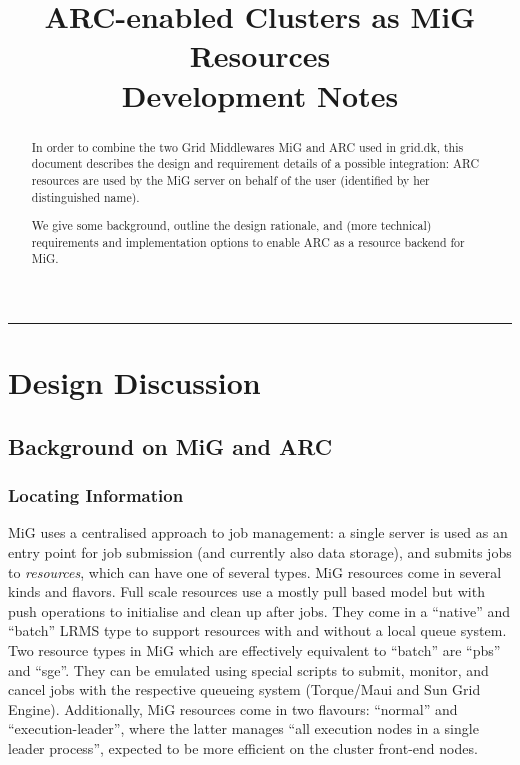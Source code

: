 \documentclass[11pt]{article}
\title{ARC-enabled Clusters as MiG Resources\\[2ex] 
       Development Notes}
\newcommand{\horiz}{{\rule{\textwidth}{.5pt}}}
\begin{document}
\maketitle

\horiz

\begin{abstract}
In order to combine the two Grid Middlewares MiG and ARC used in
grid.dk, this document describes the design and requirement details of
a possible integration: ARC resources are used by the MiG server on
behalf of the user (identified by her distinguished name).

We give some background, outline the design rationale, and (more
technical) requirements and implementation options to enable ARC as a
resource backend for MiG.
\end{abstract}

\tableofcontents


\section{Design Discussion}

\subsection{Background on MiG and ARC}

\subsubsection{Locating Information}
MiG uses a centralised approach to job management: a single server is
used as an entry point for job submission (and currently also data
storage), and submits jobs to \emph{resources}, which can have one of
several types.
%
MiG resources come in several kinds and flavors. Full scale resources
use a mostly pull based model but with push operations to initialise
and clean up after jobs. They come in a ``native'' and ``batch'' LRMS
type to support resources with and without a local queue system.
%
Two resource types in MiG which are effectively equivalent to
``batch'' are ``pbs'' and ``sge''. They can be emulated using special
scripts to submit, monitor, and cancel jobs with the respective
queueing system (Torque/Maui and Sun Grid Engine).
Additionally, MiG resources come in two flavours: ``normal'' and
``execution-leader'', where the latter manages ``all execution nodes
in a single leader process'', expected to be more efficient on the
cluster front-end nodes.
\end{document}
